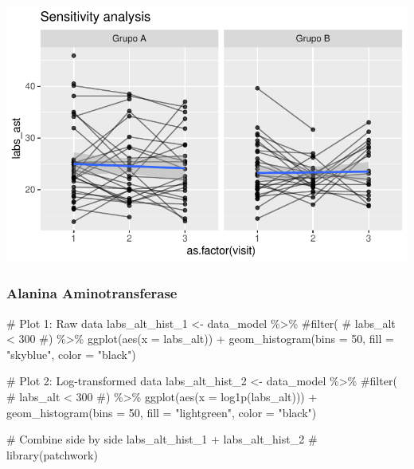 \documentclass[
  12pt,
]{article}
\newenvironment{Shaded}{\begin{snugshade}}{\end{snugshade}}
\newcommand{\AttributeTok}[1]{\textcolor[rgb]{0.40,0.45,0.13}{#1}}
\newcommand{\CommentTok}[1]{\textcolor[rgb]{0.37,0.37,0.37}{#1}}
\newcommand{\DecValTok}[1]{\textcolor[rgb]{0.68,0.00,0.00}{#1}}
\newcommand{\FunctionTok}[1]{\textcolor[rgb]{0.28,0.35,0.67}{#1}}
\newcommand{\NormalTok}[1]{\textcolor[rgb]{0.00,0.23,0.31}{#1}}
\newcommand{\OtherTok}[1]{\textcolor[rgb]{0.00,0.23,0.31}{#1}}
\newcommand{\SpecialCharTok}[1]{\textcolor[rgb]{0.37,0.37,0.37}{#1}}
\newcommand{\StringTok}[1]{\textcolor[rgb]{0.13,0.47,0.30}{#1}}
\begin{document}
\includegraphics{Outcomes_files/figure-pdf/labs_ast_6-2.pdf}

\subsubsection{Alanina Aminotransferase}\label{alanina-aminotransferase}

\begin{Shaded}
\begin{Highlighting}[]
\CommentTok{\# Plot 1: Raw data}
\NormalTok{labs\_alt\_hist\_1 }\OtherTok{\textless{}{-}}\NormalTok{ data\_model }\SpecialCharTok{\%\textgreater{}\%} 
    \CommentTok{\#filter(}
    \CommentTok{\#    labs\_alt \textless{} 300}
    \CommentTok{\#) \%\textgreater{}\% }
    \FunctionTok{ggplot}\NormalTok{(}\FunctionTok{aes}\NormalTok{(}\AttributeTok{x =}\NormalTok{ labs\_alt)) }\SpecialCharTok{+} 
    \FunctionTok{geom\_histogram}\NormalTok{(}\AttributeTok{bins =} \DecValTok{50}\NormalTok{, }\AttributeTok{fill =} \StringTok{"skyblue"}\NormalTok{, }\AttributeTok{color =} \StringTok{"black"}\NormalTok{)}

\CommentTok{\# Plot 2: Log{-}transformed data}
\NormalTok{labs\_alt\_hist\_2 }\OtherTok{\textless{}{-}}\NormalTok{ data\_model }\SpecialCharTok{\%\textgreater{}\%} 
    \CommentTok{\#filter(}
    \CommentTok{\#    labs\_alt \textless{} 300}
    \CommentTok{\#) \%\textgreater{}\%}
    \FunctionTok{ggplot}\NormalTok{(}\FunctionTok{aes}\NormalTok{(}\AttributeTok{x =} \FunctionTok{log1p}\NormalTok{(labs\_alt))) }\SpecialCharTok{+} 
    \FunctionTok{geom\_histogram}\NormalTok{(}\AttributeTok{bins =} \DecValTok{50}\NormalTok{, }\AttributeTok{fill =} \StringTok{"lightgreen"}\NormalTok{, }\AttributeTok{color =} \StringTok{"black"}\NormalTok{)}

\CommentTok{\# Combine side by side}
\NormalTok{labs\_alt\_hist\_1 }\SpecialCharTok{+}\NormalTok{ labs\_alt\_hist\_2 }\CommentTok{\# library(patchwork)}
\end{Highlighting}
\end{Shaded}
\end{document}
